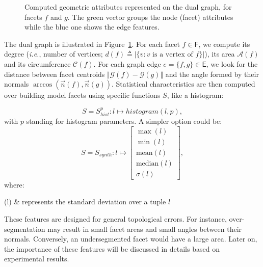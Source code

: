         \begin{figure}[htbp]
            \centering
            
            \caption{
                \label{fig::geometric_features}
                Computed geometric attributes represented on the dual graph, for facets $f$ and $g$.
                The green vector groups the node (facet) attributes while the blue one shows the edge features.
            }
        \end{figure}
        The dual graph is illustrated in Figure~\ref{fig::geometric_features}.
        For each facet $f \in \mathsf{F}$, we compute its degree (\textit{i.e.}, number of vertices; $d(f) \triangleq \vert\{v : v\text{ is a vertex of }f\}\vert$), its area $\mathscr{A}(f)$ and its circumference $\mathscr{C}(f)$.
        For each graph edge $e=\{f, g\} \in \mathsf{E}$, we look for the distance between facet centroids $\Vert \mathscr{G}(f) - \mathscr{G}(g) \Vert$ and the angle formed by their normals $\arccos(\vec{n}(f), \vec{n}(g))$.
        Statistical characteristics are then computed over building model facets using specific functions $S$, like a histogram:        

        \begin{equation}
        	S = S^p_{hist}: l \mapsto histogram(l, p),
        \end{equation}
        with $p$ standing for histogram parameters. A simpler option could be:
        \begin{equation}
            S = S_{synth}: l \mapsto \begin{bmatrix}
                \max(l)\\
                \min(l)\\
                \text{mean}(l)\\
                \text{median}(l)\\
                \sigma(l)
            \end{bmatrix},
        \end{equation}
        where:
        \begin{conditions}
            \sigma(l) & represents the standard deviation over a tuple $l$
        \end{conditions}

        These features are designed for general topological errors.
        For instance, over-segmentation may result in small facet areas and small angles between their normals.
        Conversely, an undersegmented facet would have a large area.
        Later on, the importance of these features will be discussed in details based on experimental results.
        
